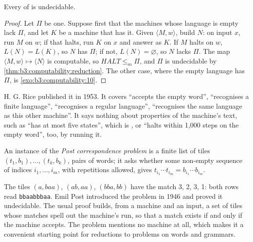 \begin{theorem}\label{thm:b3:computability:rice}
Every   of  is undecidable.
\end{theorem}

\begin{proof}
Let $\Pi$ be one. Suppose first that the machines whose language is empty lack $\Pi$, and let $K$ be a machine that has it. Given $\langle M, w \rangle$, build $N$: on input $x$, run $M$ on $w$; if that halts, run $K$ on $x$ and answer as $K$. If $M$ halts on $w$, $L(N) = L(K)$, so $N$ has $\Pi$; if not, $L(N) = \varnothing$, so $N$ lacks $\Pi$. The map $\langle M, w \rangle \mapsto \langle N \rangle$ is computable, so $\mathit{HALT} \le_m \Pi$, and $\Pi$ is undecidable by \cref{thm:b3:computability:reduction}. The other case, where the empty language has $\Pi$, is \cref{exo:b3:computability:10}.
\end{proof}

H. G. Rice published it in 1953. %
It covers ``accepts the empty word'', ``recognises a finite language'', ``recognises a regular language'', ``recognises the same language as this other machine''. It says nothing about properties of the machine's text, such as ``has at most five states'', which is , or ``halts within 1,000 steps on the empty word'',  too, by running it.

\begin{definition}\label{def:b3:computability:pcp}
An instance of the \emph{Post correspondence problem} is a finite list of tiles $(t_1, b_1), \ldots, (t_k, b_k)$, pairs of words; it asks whether some non-empty sequence of indices $i_1, \ldots, i_m$, with repetitions allowed, gives $t_{i_1} \cdots t_{i_m} = b_{i_1} \cdots b_{i_m}$.
\end{definition}

The tiles $(a, baa)$, $(ab, aa)$, $(bba, bb)$ have the match 3, 2, 3, 1: both rows read \texttt{bbaabbbaa}. Emil Post introduced the problem in 1946 and proved it undecidable. %
The usual proof builds, from a machine and an input, a set of tiles whose matches spell out the machine's run, so that a match exists if and only if the machine accepts. %
The problem mentions no machine at all, which makes it a convenient starting point for reductions to problems on words and grammars.

